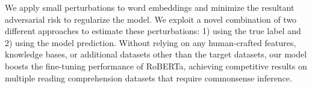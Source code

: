 We apply small perturbations to word embeddings and minimize the resultant adversarial risk to regularize the model. We exploit a novel combination of two different approaches to estimate these perturbations: 1) using the true label and 2) using the model prediction. Without relying on any human-crafted features, knowledge bases, or additional datasets other than the target datasets, our model boosts the fine-tuning performance of RoBERTa, achieving competitive results on multiple reading comprehension datasets that require commonsense inference.
